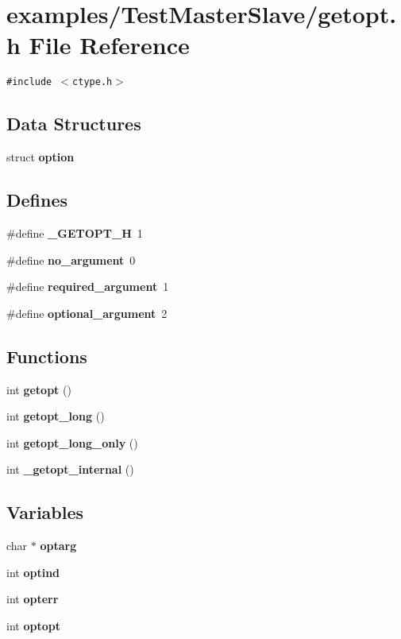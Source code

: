\section{examples/Test\-Master\-Slave/getopt.h File Reference}
\label{TestMasterSlave_2getopt_8h}
{\tt \#include $<$ctype.h$>$}\par
\subsection*{Data Structures}
\begin{CompactItemize}
\item 
struct {\bf option}
\end{CompactItemize}
\subsection*{Defines}
\begin{CompactItemize}
\item 
\#define {\bf \_\-GETOPT\_\-H}~1
\item 
\#define {\bf no\_\-argument}~0
\item 
\#define {\bf required\_\-argument}~1
\item 
\#define {\bf optional\_\-argument}~2
\end{CompactItemize}
\subsection*{Functions}
\begin{CompactItemize}
\item 
int {\bf getopt} ()
\item 
int {\bf getopt\_\-long} ()
\item 
int {\bf getopt\_\-long\_\-only} ()
\item 
int {\bf \_\-getopt\_\-internal} ()
\end{CompactItemize}
\subsection*{Variables}
\begin{CompactItemize}
\item 
char $\ast$ {\bf optarg}
\item 
int {\bf optind}
\item 
int {\bf opterr}
\item 
int {\bf optopt}
\end{CompactItemize}



